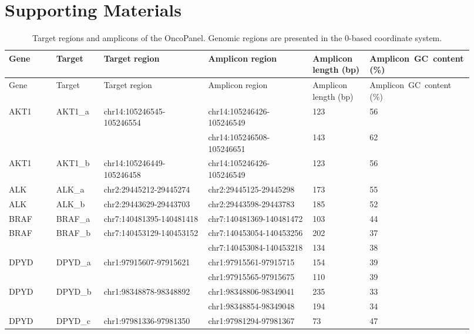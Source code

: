 \chapter{Supporting Materials}


\begin{landscape}
\begin{longtable}{p{0.1\linewidth}|p{0.1\linewidth}p{0.22\linewidth}p{0.22\linewidth}p{0.12\linewidth}p{0.16\linewidth}}
\caption[Target regions and amplicons of the OncoPanel.]{Target regions and amplicons of the OncoPanel. Genomic regions are presented in the 0-based coordinate system.}
\label{tbl:amplicons_target_regions}
\\
\hline
Gene & Target & Target region & Amplicon region & Amplicon length (bp) & \hbox{Amplicon GC content} (\%)
\\
\hline
\endfirsthead
\hline
Gene & Target & Target region & Amplicon region & Amplicon length (bp) & \hbox{Amplicon GC content} (\%)
\\
\hline
\endhead
AKT1 & AKT1\_a & chr14:105246545-105246554 & chr14:105246426-105246549 & 123 & 56
\\
 & & & chr14:105246508-105246651 & 143 & 62
\\
AKT1 & AKT1\_b & chr14:105246449-105246458 & chr14:105246426-105246549 & 123 & 56
\\
\hline
ALK & ALK\_a & chr2:29445212-29445274 & chr2:29445125-29445298 & 173 & 55
\\
ALK & ALK\_b & chr2:29443629-29443703 & chr2:29443598-29443783 & 185 & 52
\\
\hline
BRAF & BRAF\_a & chr7:140481395-140481418 & chr7:140481369-140481472 & 103 & 44
\\
BRAF & BRAF\_b & chr7:140453129-140453152 & chr7:140453054-140453256 & 202 & 37
\\
 & & & chr7:140453084-140453218 & 134 & 38
\\
\hline
DPYD & DPYD\_a & chr1:97915607-97915621 & chr1:97915561-97915715 & 154 & 39
\\
 & & & chr1:97915565-97915675 & 110 & 39
\\
DPYD & DPYD\_b & chr1:98348878-98348892 & chr1:98348806-98349041 & 235 & 33
\\
 & & & chr1:98348854-98349048 & 194 & 34
\\
DPYD & DPYD\_c & chr1:97981336-97981350 & chr1:97981294-97981367 & 73 & 47

\end{longtable}
\end{landscape}
